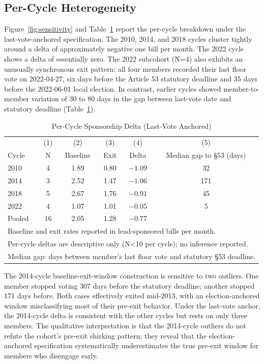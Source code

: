 \documentclass[11pt]{article}
\begin{document}
\subsection{Per-Cycle Heterogeneity}

Figure~\ref{fig:sensitivity} and Table~\ref{tab:cycle} report the per-cycle breakdown under the last-vote-anchored specification. The 2010, 2014, and 2018 cycles cluster tightly around a delta of approximately negative one bill per month. The 2022 cycle shows a delta of essentially zero. The 2022 subcohort (N=4) also exhibits an unusually synchronous exit pattern: all four members recorded their last floor vote on 2022-04-27, six days before the Article 53 statutory deadline and 35 days before the 2022-06-01 local election. In contrast, earlier cycles showed member-to-member variation of 30 to 80 days in the gap between last-vote date and statutory deadline (Table~\ref{tab:cycle}).

\begin{table}[H]
\centering
\caption{Per-Cycle Sponsorship Delta (Last-Vote Anchored)}
\label{tab:cycle}
\begin{tabular}{lccccc}
\toprule
 & (1) & (2) & (3) & (4) & (5) \\
Cycle & N & Baseline & Exit & Delta & Median gap to \S 53 (days) \\
\midrule
2010 & 4 & 1.89 & 0.80 & $-1.09$ & 32 \\
2014 & 3 & 2.52 & 1.47 & $-1.06$ & 171 \\
2018 & 5 & 2.67 & 1.76 & $-0.91$ & 45 \\
2022 & 4 & 1.07 & 1.01 & $-0.05$ & 5 \\
\midrule
Pooled & 16 & 2.05 & 1.28 & $-0.77$ & \\
\bottomrule
\multicolumn{6}{l}{\footnotesize Baseline and exit rates reported in lead-sponsored bills per month.} \\
\multicolumn{6}{l}{\footnotesize Per-cycle deltas are descriptive only (N<10 per cycle); no inference reported.} \\
\multicolumn{6}{l}{\footnotesize Median gap: days between member's last floor vote and statutory \S 53 deadline.} \\
\end{tabular}
\end{table}

The 2014-cycle baseline-exit-window construction is sensitive to two outliers. One member stopped voting 307 days before the statutory deadline; another stopped 171 days before. Both cases effectively exited mid-2013, with an election-anchored window misclassifying most of their pre-exit behavior. Under the last-vote anchor, the 2014-cycle delta is consistent with the other cycles but rests on only three members. The qualitative interpretation is that the 2014-cycle outliers do not refute the cohort's pre-exit shirking pattern; they reveal that the election-anchored specification systematically underestimates the true pre-exit window for members who disengage early.
\end{document}
